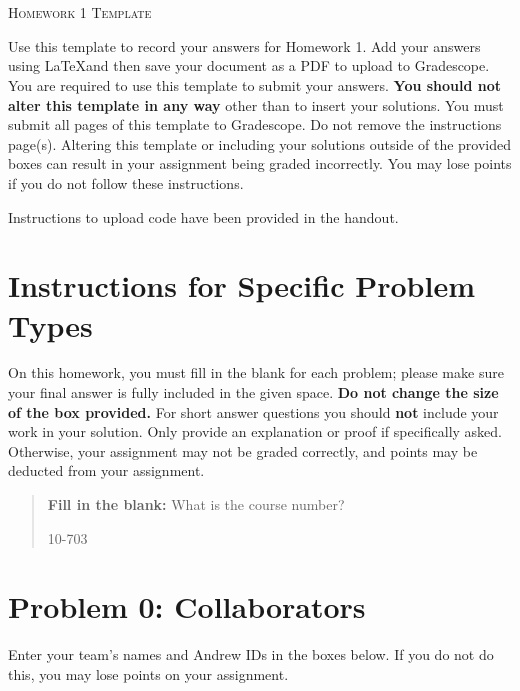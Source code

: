 \documentclass[12pt]{article}
\begin{document}
\section*{}
\begin{center}
  \centerline{\textsc{\LARGE  Homework 1 Template}}
\end{center}

Use this template to record your answers for Homework 1.  Add your answers using \LaTeX and then save your document as a PDF to upload to Gradescope.  You are required to use this template to submit your answers.  \textbf{You should not alter this template in any way} other than to insert your solutions.  You must submit all \pageref{LastPage} pages of this template to Gradescope.  Do not remove the instructions page(s).  Altering this template or including your solutions outside of the provided boxes can result in your assignment being graded incorrectly.  You may lose points if you do not follow these instructions.

Instructions to upload code have been provided in the handout.

\section*{Instructions for Specific Problem Types}

On this homework, you must fill in the blank for each problem; please make sure your final answer is fully included in the given space.  \textbf{Do not change the size of the box provided.}  For short answer questions you should \textbf{not} include your work in your solution.  Only provide an explanation or proof if specifically asked.  Otherwise, your assignment may not be graded correctly, and points may be deducted from your assignment.

\begin{quote}
\textbf{Fill in the blank:} What is the course number?

\begin{tcolorbox}[fit,height=1cm, width=4cm, blank, borderline={1pt}{-2pt},valign=center,nobeforeafter]
    \begin{center}\huge 10-703 \end{center}
    \end{tcolorbox}
\end{quote}

\newpage

\section*{Problem 0: Collaborators}
Enter your team's names and Andrew IDs in the boxes below.  If you do not do this, you may lose points on your assignment.
\end{document}
